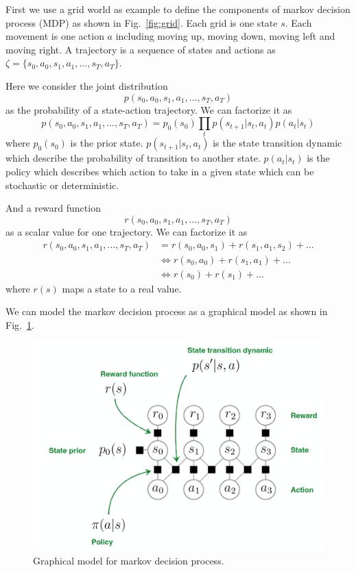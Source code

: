 \documentclass[11pt]{article}
\begin{document}
First we use a grid world as example to define the components of markov decision process (MDP) as shown in Fig.~\ref{fig:grid}. Each grid is one state $s$. Each movement is one action $a$ including moving up, moving down, moving left and moving right. A trajectory is a sequence of states and actions as $\zeta = \{ s_0, a_0, s_1, a_1, ..., s_T, a_T\}$. 


Here we consider the joint distribution
\begin{equation}
    p(s_0, a_0, s_1, a_1, ..., s_T, a_T)
\end{equation}
 as the probability of a state-action trajectory. We can factorize it as
\begin{equation}
    p(s_0, a_0, s_1, a_1, ..., s_T, a_T) = p_0(s_0) \prod_{t} p(s_{t+1}| s_t, a_t) p(a_t|s_t)
\end{equation}
where $p_0(s_0)$ is the prior state. $p(s_{t+1}| s_t, a_t)$ is the state transition dynamic which describe the probability of transition to another state. $p(a_t|s_t)$ is the policy which describes which action to take in a given state which can be stochastic or deterministic. 
 
 And a reward function 
\begin{equation}
    r(s_0, a_0, s_1, a_1, ..., s_T, a_T)
\end{equation}
as a scalar value for one trajectory. We can factorize it as 
\begin{equation}
\begin{split}
    r(s_0, a_0, s_1, a_1, ..., s_T, a_T) & = r(s_0, a_0, s_1) + r(s_1, a_1, s_2) + ... \\
    & \Leftrightarrow r(s_0, a_0) + r(s_1, a_1) + ... \\
    & \Leftrightarrow r(s_0) + r(s_1) + ... 
\end{split}
\end{equation}
where $r(s)$ maps a state to a real value.

We can model the markov decision process as a graphical model as shown in Fig.~\ref{fig:graph}.

\begin{figure}[htbp]
    \centering
\includegraphics[width=15cm]{imgs/graph_model.png}
    \caption{Graphical model for markov decision process.}
    \label{fig:graph}
\end{figure} 
\end{document}
